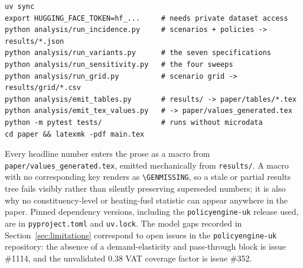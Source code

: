 \begin{verbatim}
uv sync
export HUGGING_FACE_TOKEN=hf_...     # needs private dataset access
python analysis/run_incidence.py     # scenarios + policies -> results/*.json
python analysis/run_variants.py      # the seven specifications
python analysis/run_sensitivity.py   # the four sweeps
python analysis/run_grid.py          # scenario grid -> results/grid/*.csv
python analysis/emit_tables.py       # results/ -> paper/tables/*.tex
python analysis/emit_tex_values.py   # -> paper/values_generated.tex
python -m pytest tests/              # runs without microdata
cd paper && latexmk -pdf main.tex
\end{verbatim}

Every headline number enters the prose as a macro from \texttt{paper/values\_generated.tex}, emitted mechanically from \texttt{results/}. A macro with no corresponding key renders as \texttt{\textbackslash GENMISSING}, so a stale or partial results tree fails visibly rather than silently preserving superseded numbers; it is also why no constituency-level or heating-fuel statistic can appear anywhere in the paper. Pinned dependency versions, including the \texttt{policyengine-uk} release used, are in \texttt{pyproject.toml} and \texttt{uv.lock}. The model gaps recorded in Section~\ref{sec:limitations} correspond to open issues in the \texttt{policyengine-uk} repository: the absence of a demand-elasticity and pass-through block is issue \#1114, and the unvalidated 0.38 VAT coverage factor is issue \#352.
